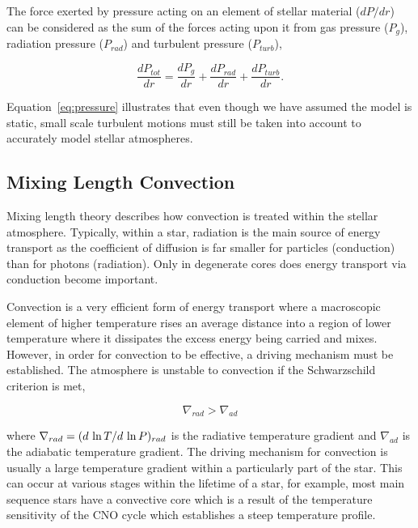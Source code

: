 The force exerted by pressure acting on an element of stellar material ($dP/dr$) can be considered as the sum of the forces acting upon it from gas pressure ($P_{g}$), radiation pressure ($P_{rad}$) and turbulent pressure ($P_{turb}$),

\begin{equation}
    \frac{dP_{tot}}{dr} = \frac{dP_{g}}{dr} + \frac{dP_{rad}}{dr} + \frac{dP_{turb}}{dr}.\label{eq:pressure}
\end{equation}

Equation~\ref{eq:pressure} illustrates that even though we have assumed the model is static, small scale turbulent motions must still be taken into account to accurately model stellar atmospheres.



\subsection{Mixing Length Convection} %
\label{sub:mlt}

Mixing length theory describes how convection is treated within the stellar atmosphere.
Typically, within a star, radiation is the main source of energy transport as the coefficient of diffusion is far smaller for particles (conduction) than for photons (radiation).
Only in degenerate cores does energy transport via conduction become important.

Convection is a very efficient form of energy transport where a macroscopic element of higher temperature rises an average distance into a region of lower temperature where it dissipates the excess energy being carried and mixes.
However, in order for convection to be effective, a driving mechanism must be established.
The atmosphere is unstable to convection if the Schwarzschild criterion is met,

\begin{equation}
    \nabla_{rad} > \nabla_{ad}
\end{equation}

\noindent where $\nabla_{rad} = (d~{\rm ln}\,T/d~{\rm ln}\,P)_{rad}$ is the radiative temperature gradient and $\nabla_{ad}$ is the adiabatic temperature gradient.
The driving mechanism for convection is usually a large temperature gradient within a particularly part of the star.
This can occur at various stages within the lifetime of a star, for example, most main sequence stars have a convective core which is a result of the temperature sensitivity of the CNO cycle which establishes a steep temperature profile.

